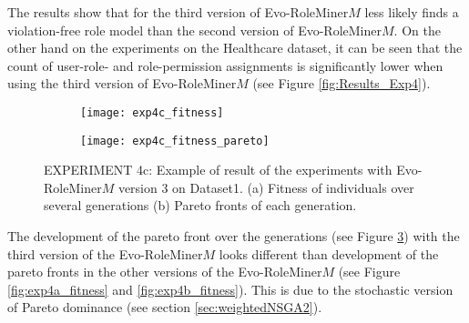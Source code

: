 The results show that for the third version of Evo-RoleMiner$M$ less likely finds a violation-free role model than the second version of Evo-RoleMiner$M$. On the other hand on the experiments on the Healthcare dataset, it can be seen that the count of user-role- and role-permission assignments is significantly lower when using the third version of Evo-RoleMiner$M$ (see Figure \ref{fig:Results_Exp4}).

\begin{figure}[H]
	\centering
	\begin{subfigure}{\textwidth}
		\centering
		\texttt{[image: exp4c\_fitness]}
		\caption{}
		\label{fig:exp4c_fitness_A}
	\end{subfigure}
	\begin{subfigure}{\textwidth}
		\centering
		\texttt{[image: exp4c\_fitness\_pareto]}
		\caption{}
		\label{fig:exp4c_fitness_B}
	\end{subfigure}
	\caption{EXPERIMENT 4c: Example of result of the experiments with Evo-RoleMiner$M$ version 3 on Dataset1. (a) Fitness of individuals over several generations (b) Pareto fronts of each generation.}
	\label{fig:exp4c_fitness}
\end{figure}

The development of the pareto front over the generations (see Figure \ref{fig:exp4c_fitness}) with the third version of the Evo-RoleMiner$M$ looks different than development of the pareto fronts in the other versions of the Evo-RoleMiner$M$ (see Figure \ref{fig:exp4a_fitness} and \ref{fig:exp4b_fitness}). This is due to the stochastic version of Pareto dominance (see section \ref{sec:weightedNSGA2}).